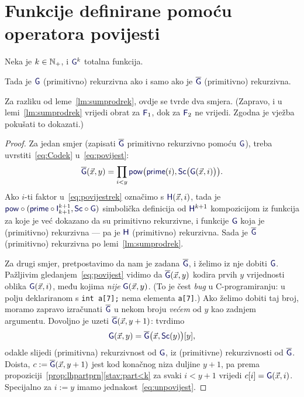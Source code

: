 \section{Funkcije definirane pomoću operatora povijesti}

\begin{lema}\label{lm:povijestrek}
Neka je $k\in{\mathbb N}_+$, i $\f{G}^k$ totalna funkcija.

Tada je ${\f G}$ (primitivno) rekurzivna ako i samo ako je $\overline{\f G}$ (primitivno) rekurzivna.
\end{lema}

Za razliku od leme~\ref{lm:sumprodrek}, ovdje se tvrde dva smjera. (Zapravo, i u lemi~\ref{lm:sumprodrek} vrijedi obrat za $\f F_1$, dok za $\f F_2$ ne vrijedi. Zgodna je vježba pokušati to dokazati.)
\begin{proof}
Za jedan smjer (zapisati $\overline{\f G}$ primitivno rekurzivno pomoću $\f G$), treba uvrstiti~\eqref{eq:Codek} u~\eqref{eq:povijest}:
\begin{equation}\label{eq:povijestrek}
    \overline{\f G}(\vec x,y)=\prod_{i<y}\f{pow}\bigl(\f{prime}(i),\f{Sc}\bigl(\f{G}(\vec x,i)\bigr)\bigr)\text.
\end{equation}
Ako $i$-ti faktor u~\eqref{eq:povijestrek} označimo s $\f H(\vec x,i)$, tada je $\f{pow}\circ(\f{prime}\circ\f I_{k+1}^{k+1},\f{Sc}\circ\f G)$ sim\-bo\-li\-čka definicija od $\f H^{k+1}$ kompozicijom iz funkcija za koje je već dokazano da su primitivno rekurzivne, i funkcije $\f G$ koja je (primitivno) rekurzivna --- pa je $\f H$ (primitivno) rekurzivna. Sada je $\overline{\f G}$ (primitivno) rekurzivna po lemi~\ref{lm:sumprodrek}.

Za drugi smjer, pretpostavimo da nam je zadana $\overline{\f G}$, i želimo iz nje dobiti $\f G$. Pažljivim gledanjem~\eqref{eq:povijest} vidimo da $\overline{\f G}(\vec x,y)$ kodira prvih $y$ vrijednosti oblika $\f G(\vec x,i)$, među kojima \emph{nije} $\f G(\vec x,y)$. (To je čest \emph{bug} u C-programiranju: u polju deklariranom s \texttt{int a[7];} nema elementa \texttt{a[7]}.) Ako želimo dobiti taj broj, moramo zapravo izračunati $\overline{\f G}$ u nekom broju \emph{većem} od $y$ kao zadnjem argumentu. Dovoljno je uzeti $\overline{\f G}(\vec x,y+1)$: tvrdimo
\begin{equation}\label{eq:unpovijest}
    \f G(\vec x,y)=\overline{\f G}\bigl(\vec x,\f{Sc}(y)\bigr)[y]\text,
\end{equation}
odakle slijedi (primitivna) rekurzivnost od $\f G$, iz (primitivne) rekurzivnosti od $\overline{\f G}$. Doista, $c:=\overline{\f G}(\vec x,y+1)$ jest kod konačnog niza duljine $y+1$, pa prema propoziciji~\ref{prop:lhpartprn}\eqref{stav:part<k} za svaki $i<y+1$ vrijedi $c[i]=\f G(\vec x,i)$. Specijalno za $i:=y$ imamo jednakost~\eqref{eq:unpovijest}.
\end{proof}

